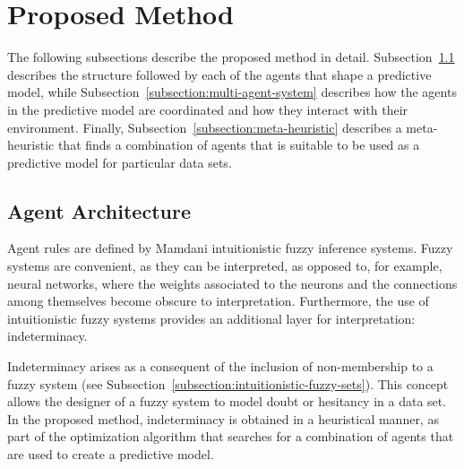 ﻿\documentclass{ieeeaccess}
\begin{document}

\section{Proposed Method}
\label{section:proposed-method}


The following subsections describe the proposed method in
detail. Subsection~\ref{subsection:agent-architecture} describes the structure
followed by each of the agents that shape a predictive model, while
Subsection~\ref{subsection:multi-agent-system} describes how the agents in the
predictive model are coordinated and how they interact with their
environment. Finally, Subsection~\ref{subsection:meta-heuristic} describes a
meta-heuristic that finds a combination of agents that is suitable to be used
as a predictive model for particular data sets.

\subsection{Agent Architecture}
\label{subsection:agent-architecture}

Agent rules are defined by Mamdani intuitionistic fuzzy inference systems. Fuzzy systems
are convenient, as they can be interpreted, as opposed to, for example, neural
networks, where the weights associated to the neurons and the connections among
themselves become obscure to interpretation. Furthermore, the use of
intuitionistic fuzzy systems provides an additional layer for interpretation:
indeterminacy.

Indeterminacy arises as a consequent of the inclusion of non-membership to a %
fuzzy system (see Subsection~\ref{subsection:intuitionistic-fuzzy-sets}). This
concept allows the designer of a fuzzy system to model doubt or hesitancy in a
data set. In the proposed method, indeterminacy is obtained in a heuristical
manner, as part of the optimization algorithm that searches for a combination of
agents that are used to create a predictive model.
\end{document}
